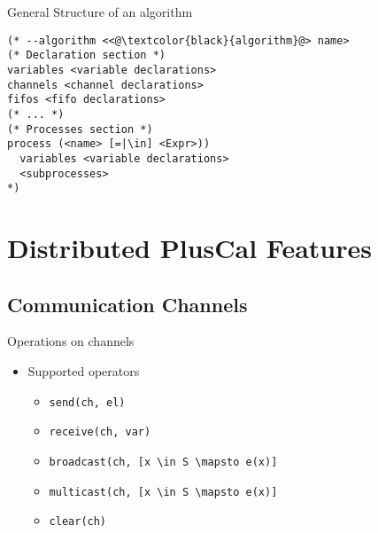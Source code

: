 \documentclass{beamer}
\begin{document}
\begin{frame}[fragile]{General Structure of an algorithm}
\begin{lstlisting}[language=pluscal, frame = tlrb, numbers = none]
(* --algorithm <<@\textcolor{black}{algorithm}@> name>
(* Declaration section *)
variables <variable declarations>
channels <channel declarations>
fifos <fifo declarations>
(* ... *)
(* Processes section *)
process (<name> [=|\in] <Expr>))
  variables <variable declarations>
  <subprocesses>
*)
\end{lstlisting}
\end{frame}

\section{Distributed PlusCal Features}

\subsection{Communication Channels}

\begin{frame}[fragile]{Operations on channels}
    \begin{itemize}
     \item Supported operators 
            \begin{itemize}
                \item \verb|send(ch, el)|
                \item \verb|receive(ch, var)|
                \item \verb|broadcast(ch, [x \in S \mapsto e(x)]| 
                \item \verb|multicast(ch, [x \in S \mapsto e(x)]|
                \item \verb|clear(ch)|
            \end{itemize}

    \end{itemize}
\end{frame}
\end{document}
